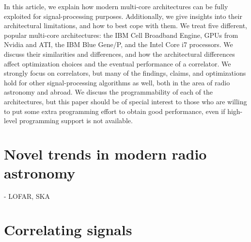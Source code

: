 \documentclass{article}
\begin{document}
In this article, we explain how modern multi-core architectures can be fully
exploited for signal-processing purposes.
Additionally, we give insights into their architectural limitations, and how
to best cope with them.
We treat five different, popular multi-core architectures: the IBM Cell
Broadband Engine, GPUs from Nvidia and ATI, the IBM Blue Gene/P, and
the Intel Core i7 processors.
We discuss their similarities and differences, and how the architectural
differences affect optimization choices and the eventual performance of a
correlator.
We strongly focus on correlators, but many of the findings, claims, and
optimizations hold for other signal-processing algorithms as well, both in the
area of radio astronomy and abroad.
We discuss the programmability of each of the architectures, but this paper
should be of special interest to those who are willing to put some extra
programming effort to obtain good performance, even if high-level programming
support is not available.


\section{Novel trends in modern radio astronomy}
    - LOFAR, SKA


\section{Correlating signals}
\end{document}
